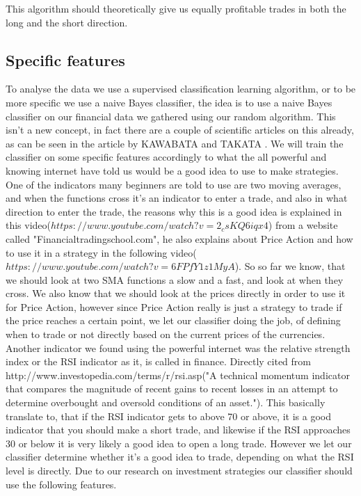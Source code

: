 \documentclass[10pt]{IEEEtran}
\begin{document}
This algorithm should theoretically give us equally profitable trades in both the long and the short direction.

\subsection{Specific features}
To analyse the data we use a supervised classification learning algorithm, or to be more specific we use a naive Bayes classifier, the idea is to use a naive Bayes classifier on our financial data we gathered using our random algorithm. This isn't a new concept, in fact there are a couple of scientific articles on this already, as can be seen in the article by KAWABATA and TAKATA \cite{fxNaiveBayes}. We will train the classifier on some specific features accordingly to what the all powerful and knowing internet have told us would be a good idea to use to make strategies. One of the indicators many beginners are told to use are two moving averages, and when the functions cross it's an indicator to enter a trade, and also in what direction to enter the trade, the reasons why this is a good idea is explained in this video($https://www.youtube.com/watch?v=2_csKQ6iqx4$) from a website called "Financialtradingschool.com", he also explains about Price Action and how to use it in a strategy in the following video($https://www.youtube.com/watch?v=6FPfY1z1MyA$). So so far we know, that we should look at two SMA functions a slow and a fast, and look at when they cross. We also know that we should look at the prices directly in order to use it for Price Action, however since Price Action really is just a strategy to trade if the price reaches a certain point, we let our classifier doing the job, of defining when to trade or not directly based on the current prices of the currencies. Another indicator we found using the powerful internet was the relative strength index or the RSI indicator as it, is called in finance. Directly cited from http://www.investopedia.com/terms/r/rsi.asp("A technical momentum indicator that compares the magnitude of recent gains to recent losses in an attempt to determine overbought and oversold conditions of an asset."). This basically translate to, that if the RSI indicator gets to above 70 or above, it is a good indicator that you should make a short trade, and likewise if the RSI approaches 30 or below it is very likely a good idea to open a long trade. However we let our classifier determine whether it's a good idea to trade, depending on what the RSI level is directly. 
Due to our research on investment strategies our classifier should use the following features.
\end{document}
